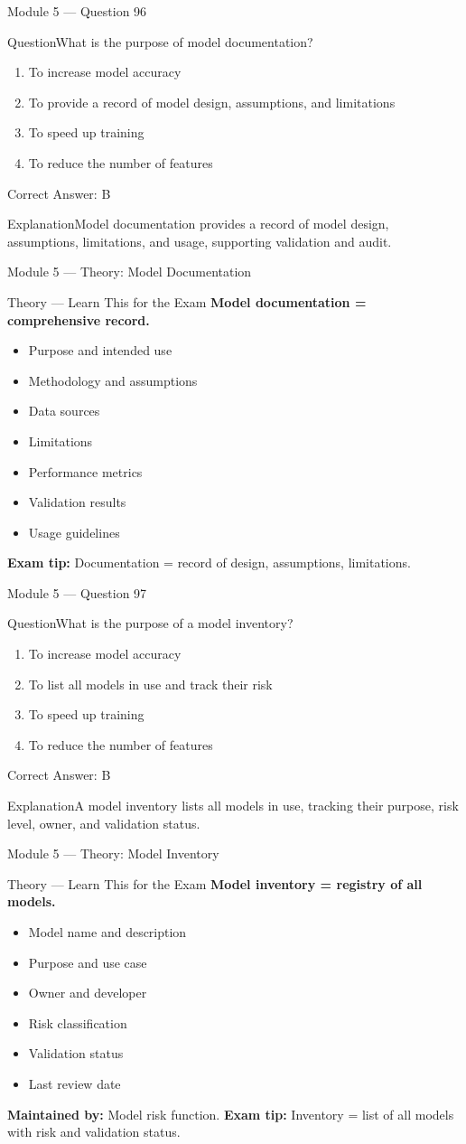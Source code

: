 \documentclass[aspectratio=169,10pt]{beamer}
\newcommand{\question}[1]{\begin{block}{Question}#1\end{block}}
\newcommand{\options}[4]{%
	\begin{enumerate}[label=\Alph*.,leftmargin=*]
		\item #1
		\item #2
		\item #3
		\item #4
	\end{enumerate}
}
\newcommand{\answerbox}[1]{\begin{exampleblock}{Correct Answer: #1}\end{exampleblock}}
\newcommand{\explain}[1]{\begin{block}{Explanation}#1\end{block}}
\newcommand{\theory}[1]{%
	\begin{block}{Theory --- Learn This for the Exam}
		\small #1
	\end{block}
}
\begin{document}
	\begin{frame}{Module 5 --- Question 96}
		\question{What is the purpose of model documentation?}
		\options{To increase model accuracy}{To provide a record of model design, assumptions, and limitations}{To speed up training}{To reduce the number of features}
		\answerbox{B}
		\explain{Model documentation provides a record of model design, assumptions, limitations, and usage, supporting validation and audit.}
	\end{frame}
	
	\begin{frame}{Module 5 --- Theory: Model Documentation}
		\theory{
			\textbf{Model documentation = comprehensive record.}
			\begin{itemize}
				\item Purpose and intended use
				\item Methodology and assumptions
				\item Data sources
				\item Limitations
				\item Performance metrics
				\item Validation results
				\item Usage guidelines
			\end{itemize}
			\textbf{Exam tip:} Documentation = record of design, assumptions, limitations.
		}
	\end{frame}
	
	\begin{frame}{Module 5 --- Question 97}
		\question{What is the purpose of a model inventory?}
		\options{To increase model accuracy}{To list all models in use and track their risk}{To speed up training}{To reduce the number of features}
		\answerbox{B}
		\explain{A model inventory lists all models in use, tracking their purpose, risk level, owner, and validation status.}
	\end{frame}
	
	\begin{frame}{Module 5 --- Theory: Model Inventory}
		\theory{
			\textbf{Model inventory = registry of all models.}
			\begin{itemize}
				\item Model name and description
				\item Purpose and use case
				\item Owner and developer
				\item Risk classification
				\item Validation status
				\item Last review date
			\end{itemize}
			\textbf{Maintained by:} Model risk function.
			\textbf{Exam tip:} Inventory = list of all models with risk and validation status.
		}
	\end{frame}
	
\end{document}
